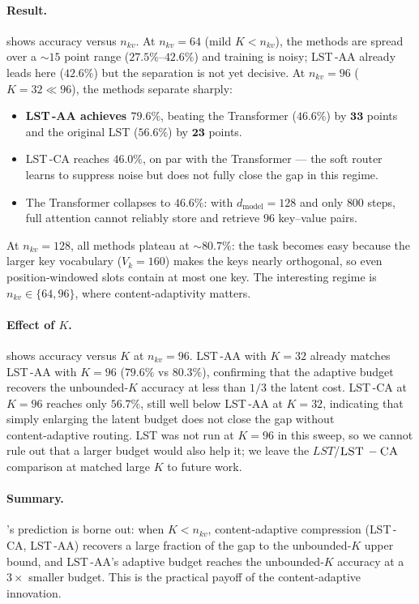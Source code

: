 \documentclass[10pt,twocolumn,letterpaper]{article}
\newcommand{\LST}{\textsc{LST}}
\newcommand{\LSTCA}{\textsc{LST\,}-\textsc{CA}}
\newcommand{\LSTAA}{\textsc{LST\,}-\textsc{AA}}
\begin{document}
\paragraph{Result.}   shows accuracy versus
$n_{kv}$.  At $n_{kv}\!=\!64$ (mild $K\!<\!n_{kv}$), the methods are
spread over a ${\sim}15$ point range ($27.5\%$--$42.6\%$) and training is
noisy; \LSTAA{} already leads here ($42.6\%$) but the separation is not
yet decisive.  At $n_{kv}\!=\!96$ ($K\!=\!32 \ll 96$), the methods
separate sharply:
\begin{itemize}[leftmargin=*,topsep=2pt,itemsep=1pt]
\item \textbf{\LSTAA{} achieves $79.6\%$}, beating the Transformer
      ($46.6\%$) by $\mathbf{33}$ points and the original \LST{}
      ($56.6\%$) by $\mathbf{23}$ points.
\item \LSTCA{} reaches $46.0\%$, on par with the Transformer — the soft
      router learns to suppress noise but does not fully close the gap
      in this regime.
\item The Transformer collapses to $46.6\%$: with $d_{\text{model}}\!=\!128$
      and only $800$ steps, full attention cannot reliably store and
      retrieve $96$ key–value pairs.
\end{itemize}
At $n_{kv}\!=\!128$, all methods plateau at $\sim\!80.7\%$: the task
becomes easy because the larger key vocabulary ($V_k\!=\!160$) makes the
keys nearly orthogonal, so even position‑windowed slots contain at most
one key.  The interesting regime is $n_{kv}\!\in\!\{64,96\}$, where
content‑adaptivity matters.

\paragraph{Effect of $K$.}   shows accuracy
versus $K$ at $n_{kv}\!=\!96$.  \LSTAA{} with $K\!=\!32$ already matches
\LSTAA{} with $K\!=\!96$ ($79.6\%$ vs $80.3\%$), confirming that the
adaptive budget recovers the unbounded‑$K$ accuracy at less than
${1}/{3}$ the latent cost.  \LSTCA{} at $K\!=\!96$ reaches only $56.7\%$,
still well below \LSTAA{} at $K\!=\!32$, indicating that simply enlarging
the latent budget does not close the gap without content‑adaptive
routing.  \LST{} was not run at $K\!=\!96$ in this sweep, so we cannot
rule out that a larger budget would also help it; we leave the
$LST$/$\LSTCA$ comparison at matched large $K$ to future work.

\paragraph{Summary.}  's prediction is borne out: when
$K\!<\!n_{kv}$, content‑adaptive compression (\LSTCA{}, \LSTAA{}) recovers
a large fraction of the gap to the unbounded‑$K$ upper bound, and
\LSTAA{}'s adaptive budget reaches the unbounded‑$K$ accuracy at a
$3\!\times$ smaller budget.  This is the practical payoff of the
content‑adaptive innovation.
\end{document}
